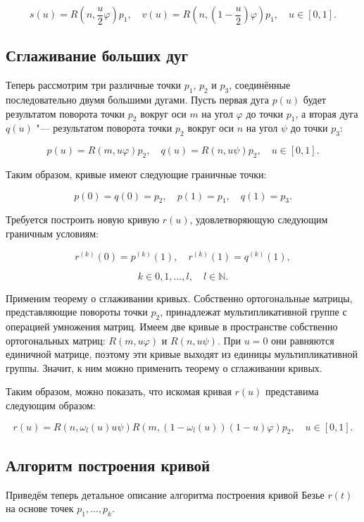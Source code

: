 \begin{equation}
s(u)=R(n,\frac{u}{2}\varphi)p_1, \quad v(u)=R(n,(1-\frac{u}{2})\varphi)p_1, \quad u \in [0,1].
\label{two-dimension-big-arc-halfs}
\end{equation}

\subsection*{Сглаживание больших дуг}

Теперь рассмотрим три различные точки $p_1$, $p_2$ и $p_3$, соединённые последовательно двумя большими
дугами. Пусть первая дуга $p(u)$ будет результатом поворота точки $p_2$ вокруг оси $m$ на угол $\varphi$ до точки $p_1$,
а вторая дуга $q(u)$ "--- результатом поворота точки $p_2$ вокруг оси $n$ на угол $\psi$ до точки $p_3$:

$$
p(u)=R(m,u\varphi)p_2, \quad q(u)=R(n,u\psi)p_2, \quad u \in [0,1].
$$

Таким образом, кривые имеют следующие граничные точки:

$$
p(0)=q(0)=p_2, \quad p(1)=p_1, \quad q(1)=p_3.
$$

Требуется построить новую кривую $r(u)$, удовлетворяющую следующим граничным условиям:

$$
r^{(k)}(0)=p^{(k)}(1), \quad r^{(k)}(1)=q^{(k)}(1),
$$

$$
k \in {0,1,\dots,l}, \quad l \in \mathbb{N}.
$$

Применим теорему о сглаживании кривых. Собственно ортогональные матрицы, представляющие повороты
точки $p_2$, принадлежат мультипликативной группе с операцией умножения матриц. Имеем две кривые в пространстве
собственно ортогональных матриц: $R(m,u\varphi)$ и $R(n,u\psi)$. При $u=0$ они равняются единичной матрице, поэтому эти
кривые выходят из единицы мультипликативной группы. Значит, к ним можно применить теорему о сглаживании кривых.

Таким образом, можно показать, что искомая кривая $r(u)$ представима следующим образом:

$$
r(u)=R(n,\omega_l(u)u\psi)R(m,(1-\omega_l(u))(1-u)\varphi)p_2, \quad u \in [0,1].
$$

\subsection*{Алгоритм построения кривой}

Приведём теперь детальное описание алгоритма построения кривой Безье $r(t)$ на основе точек $p_1,\dots,p_k$.

